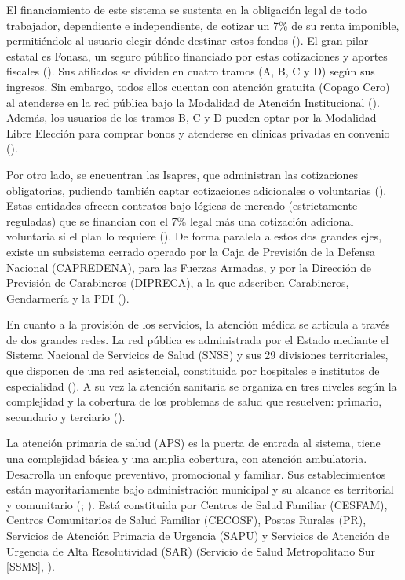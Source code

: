 \documentclass[
  spanish,
  a4paper,
  oneside]{scrbook}
\begin{document}
El financiamiento de este sistema se sustenta en la obligación legal de
todo trabajador, dependiente e independiente, de cotizar un 7\% de su
renta imponible, permitiéndole al usuario elegir dónde destinar estos
fondos (). El gran pilar estatal es Fonasa, un seguro público
financiado por estas cotizaciones y aportes fiscales
(). Sus
afiliados se dividen en cuatro tramos (A, B, C y D) según sus ingresos.
Sin embargo, todos ellos cuentan con atención gratuita (Copago Cero) al
atenderse en la red pública bajo la Modalidad de Atención Institucional
(). Además, los usuarios de los tramos B, C y D pueden optar por
la Modalidad Libre Elección para comprar bonos y atenderse en clínicas
privadas en convenio
().

Por otro lado, se encuentran las Isapres, que administran las
cotizaciones obligatorias, pudiendo también captar cotizaciones
adicionales o voluntarias
().
Estas entidades ofrecen contratos bajo lógicas de mercado (estrictamente
reguladas) que se financian con el 7\% legal más una cotización
adicional voluntaria si el plan lo requiere
().
De forma paralela a estos dos grandes ejes, existe un subsistema cerrado
operado por la Caja de Previsión de la Defensa Nacional (CAPREDENA),
para las Fuerzas Armadas, y por la Dirección de Previsión de Carabineros
(DIPRECA), a la que adscriben Carabineros, Gendarmería y la PDI
().

En cuanto a la provisión de los servicios, la atención médica se
articula a través de dos grandes redes. La red pública es administrada
por el Estado mediante el Sistema Nacional de Servicios de Salud (SNSS)
y sus 29 divisiones territoriales, que disponen de una red asistencial,
constituida por hospitales e institutos de especialidad
().
A su vez la atención sanitaria se organiza en tres niveles según la
complejidad y la cobertura de los problemas de salud que resuelven:
primario, secundario y terciario
().

La atención primaria de salud (APS) es la puerta de entrada al sistema,
tiene una complejidad básica y una amplia cobertura, con atención
ambulatoria. Desarrolla un enfoque preventivo, promocional y familiar.
Sus establecimientos están mayoritariamente bajo administración
municipal y su alcance es territorial y comunitario
(;
). Está constituida por
Centros de Salud Familiar (CESFAM), Centros Comunitarios de Salud
Familiar (CECOSF), Postas Rurales (PR), Servicios de Atención Primaria
de Urgencia (SAPU) y Servicios de Atención de Urgencia de Alta
Resolutividad (SAR) (Servicio de Salud Metropolitano Sur {[}SSMS{]},
).
\end{document}
